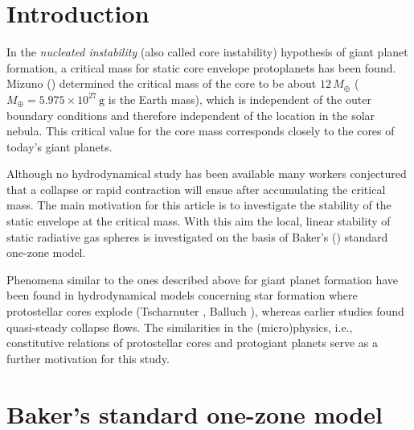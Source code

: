 \documentclass{aa}
\begin{document}

   \maketitle
%

\section{Introduction}

   In the \emph{nucleated instability\/} (also called core
   instability) hypothesis of giant planet
   formation, a critical mass for static core  envelope
   protoplanets has been found. Mizuno (\cite{mizuno}) determined
   the critical mass of the core to be about $12 \,M_\oplus$
   ($M_\oplus=5.975 \times 10^{27}\,\mathrm{g}$ is the Earth mass), which
   is independent of the outer boundary
   conditions and therefore independent of the location in the
   solar nebula. This critical value for the core mass corresponds
   closely to the cores of today's giant planets.

   Although no hydrodynamical study has been available many workers
   conjectured that a collapse or rapid contraction will ensue
   after accumulating the critical mass. The main motivation for
   this article
   is to investigate the stability of the static envelope at the
   critical mass. With this aim the local, linear stability of static
   radiative gas  spheres is investigated on the basis of Baker's
   (\cite{baker}) standard one-zone model. 

   Phenomena similar to the ones described above for giant planet
   formation have been found in hydrodynamical models concerning
   star formation where protostellar cores explode
   (Tscharnuter \cite{tscharnuter}, Balluch \cite{balluch}),
   whereas earlier studies found quasi-steady collapse flows. The
   similarities in the (micro)physics, i.e., constitutive relations of
   protostellar cores and protogiant planets serve as a further
   motivation for this study.


\section{Baker's standard one-zone model}
\end{document}
